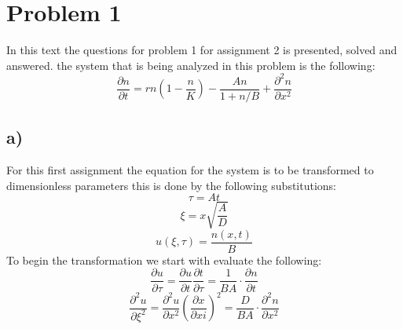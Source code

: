 \documentclass[15pt]{article}
\begin{document}
\section{Problem 1}
In this text the questions for problem 1 for assignment 2 is presented, solved and answered. the system that is being analyzed in this problem is the following:
\begin{equation}
	\frac{\partial n}{\partial t} = r n \left(1 - \frac{n}{K}\right) - \frac{A n}{1 +n/B} + \frac{\partial^2 n}{\partial x^2}
\end{equation}

\subsection{a)}
For this first assignment the equation for the system is to be transformed to dimensionless parameters this is done by the following substitutions:
\begin{equation}
	\tau = At
\end{equation}
\begin{equation}
	\xi = x\sqrt{\frac{A}{D}}
\end{equation}
\begin{equation}
	u(\xi,\tau) = \frac{n(x,t)}{B}
\end{equation}
To begin the transformation we start with evaluate the following:
\begin{equation}
	\frac{\partial u}{\partial \tau} = \frac{\partial u}{\partial t}\frac{\partial t }{\partial \tau} = \frac{1}{BA}\cdot\frac{\partial n}{\partial t}
\end{equation}
\begin{equation}
	\frac{\partial^2 u}{\partial \xi^2}	 = \frac{\partial^2 u}{\partial  x ^2} \left( \frac{\partial x}{\partial xi}\right)^2 = \frac{D}{BA} \cdot \frac{\partial^2 n}{\partial x^2}
\end{equation}
\end{document}
